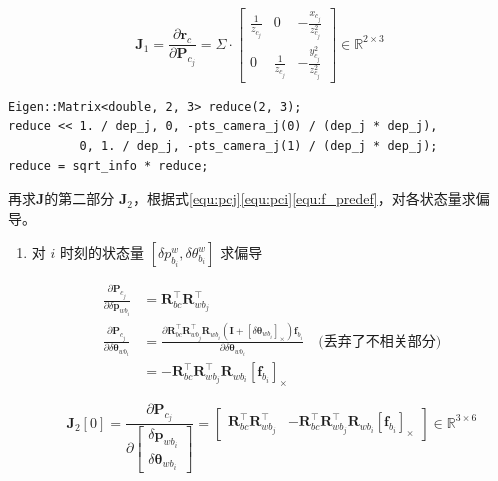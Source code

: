 \documentclass[12pt,a4paper]{article}
\begin{document}
\begin{enumerate}
\begin{equation}
\mathbf{J}_1 =
\frac{\partial \mathbf{r}_{c}}{\partial \mathbf{P}_{c_{j}}} = 
\Sigma \cdot
\left[\begin{array}{ccc}
{\frac{1}{z_{c_{j}}}} & {0} & {-\frac{x_{c_{j}}}{z_{c_{j}}^{2}}} \\ 
{0} & {\frac{1}{z_{c_{j}}}} & {-\frac{y_{c_{j}}^{2}}{z_{c_{j}}^{2}}}
\end{array}\right]
\in \mathbb{R}^{2 \times 3}
\end{equation}

\begin{lstlisting}
Eigen::Matrix<double, 2, 3> reduce(2, 3);
reduce << 1. / dep_j, 0, -pts_camera_j(0) / (dep_j * dep_j),
          0, 1. / dep_j, -pts_camera_j(1) / (dep_j * dep_j);
reduce = sqrt_info * reduce;
\end{lstlisting}

再求$\mathbf{J}$的第二部分 $\mathbf{J}_2$，根据式\eqref{equ:pcj}\eqref{equ:pci}\eqref{equ:f_predef}，对各状态量求偏导。

\begin{enumerate}

\item 对 {\color{blue} $i$ 时刻的状态量 $[\delta p^{w}_{b_{i}},\delta \theta ^{w}_{b_{i}}]$} 求偏导

\begin{equation}
\begin{aligned}
\frac{\partial \mathbf{P}_{c_{j}}}{\partial \delta \mathbf{p}_{w b_{i}}} 
&=
\mathbf{R}_{b c}^{\top} \mathbf{R}_{w b_{j}}^{\top} 
\\
\frac{\partial \mathbf{P}_{c_{j}}}{\partial \delta \boldsymbol{\theta}_{w b_{i}}} 
&=
\frac{\partial \mathbf{R}_{b c}^{\top} \mathbf{R}_{w b_{j}}^{\top} \mathbf{R}_{w b_{i}}\left(\mathbf{I}+\left[\delta \boldsymbol{\theta}_{wb_{i}}\right]_{\times}\right) \mathbf{f}_{b_{i}}}{\partial \delta \boldsymbol{\theta}_{wb_{i}}} 
\quad \text{(丢弃了不相关部分)} \\
&=
-\mathbf{R}_{b c}^{\top} \mathbf{R}_{w b_{j}}^{\top} \mathbf{R}_{w b_{i}}\left[\mathbf{f}_{b_{i}}\right]_{\times}
\end{aligned}
\end{equation}

\begin{equation}
\mathbf{J}_2[0] 
=
\frac{\partial \mathbf{P}_{c_{j}}}
{\partial \left[\begin{array}{c}{\delta \mathbf{p}_{w b_{i}}} \\ 
{\delta \boldsymbol{\theta}_{w b_{i}}}\end{array}\right]} 
=
\begin{bmatrix}
\mathbf{R}_{b c}^{\top} \mathbf{R}_{w b_{j}}^{\top} & 
-\mathbf{R}_{b c}^{\top} \mathbf{R}_{w b_{j}}^{\top} \mathbf{R}_{w b_{i}}\left[\mathbf{f}_{b_{i}}\right]_{\times}
\end{bmatrix}
\in \mathbb{R}^{3 \times 6}
\end{equation}


\end{enumerate}
\end{enumerate}
\end{document}
